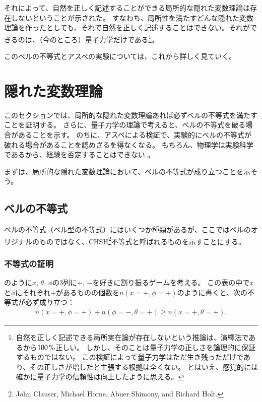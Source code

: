 \documentclass[10pt,b5paper,papersize,dvipdfmx]{jsbook}
\begin{document}
それによって、自然を正しく記述することができる局所的な隠れた変数理論は存在しないということが示された。
すなわち、局所性を満たすどんな隠れた変数理論を作ったとしても、それで自然を正しく記述することはできない。それができるのは、（今のところ）量子力学だけである\footnote{
  自然を正しく記述できる局所実在論が存在しないという推論は、演繹法であるから$100\tani{\%}$正しい。
  しかし、そのことは量子力学の正しさを論理的に保証するものではない。
  この検証によって量子力学はただ生き残っただけであり、その正しさが増したと主張する根拠は全くない。
  とはいえ、感覚的には確かに量子力学の信頼性は向上したように思える。
}。\par
このベルの不等式とアスペの実験については、これから詳しく見ていく。

\fi
\ifsecII
\section{隠れた変数理論}\label{sec:2}

このセクションでは、局所的な隠れた変数理論あれば必ずベルの不等式を満たすことを証明する。
さらに、量子力学の理論で考えると、ベルの不等式を破る場合があることを示す。
のちに、アスペによる検証で、実験的にベルの不等式が破れる場合があることを認めざるを得なくなる。
もちろん、物理学は実験科学であるから、経験を否定することはできない
。\par
まずは、局所的な隠れた変数理論において、ベルの不等式が成り立つことを示そう。

%
\subsection{ベルの不等式} %

ベルの不等式（ベル型の不等式）にはいくつか種類があるが、ここではベルのオリジナルのものではなく、CHSH\footnote{
  John Clauser, Michael Horne, Abner Shimony, and Richard Holt. %
}不等式と呼ばれるものを示すことにする。


%
\subsubsection{不等式の証明}
のように$x$, $\theta$, $\phi$の3列に$+$, $-$を好きに割り振るゲームを考える。
この表の中で$x$と$\phi$にそれぞれ$+$があるものの個数を$n(x=+,\phi=+)$のように書くと、次の不等式が必ず成り立つ：
\begin{align}
  n(x=+,\phi=+) + n(\phi=-,\theta=+) \ge n(x=+,\theta=+).
  \label{eq:bell's ineq}
\end{align}
\end{document}

